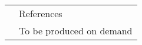 \documentclass[a4paper, 11pt]{article}
\newcommand{\headingfont}{\Large\color{Bittersweet}}
\newenvironment{SectionTable}[1]{
	\renewcommand*{\arraystretch}{1.7}
	\setlength{\tabcolsep}{10pt}
	\begin{longtable}{Rp{5.2in}} & #1 \\}
{\end{longtable}\vspace{-.3cm}}
\begin{document}





\begin{SectionTable}{\headingfont References}
& To be produced on demand
\end{SectionTable}

\end{document}
